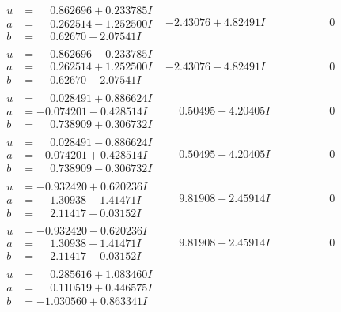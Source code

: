\documentclass[1p]{elsarticle_modified}
\theoremstyle{definition}
\begin{document}
$$\begin{array}{c|c|c}
\begin{aligned}
u &= \phantom{-}0.862696 + 0.233785 I \\
a &= \phantom{-}0.262514 - 1.252500 I \\
b &= \phantom{-}0.62670 - 2.07541 I\end{aligned}
 & -2.43076 + 4.82491 I & \phantom{-0.000000 } 0 \\ \hline\begin{aligned}
u &= \phantom{-}0.862696 - 0.233785 I \\
a &= \phantom{-}0.262514 + 1.252500 I \\
b &= \phantom{-}0.62670 + 2.07541 I\end{aligned}
 & -2.43076 - 4.82491 I & \phantom{-0.000000 } 0 \\ \hline\begin{aligned}
u &= \phantom{-}0.028491 + 0.886624 I \\
a &= -0.074201 - 0.428514 I \\
b &= \phantom{-}0.738909 + 0.306732 I\end{aligned}
 & \phantom{-}0.50495 + 4.20405 I & \phantom{-0.000000 } 0 \\ \hline\begin{aligned}
u &= \phantom{-}0.028491 - 0.886624 I \\
a &= -0.074201 + 0.428514 I \\
b &= \phantom{-}0.738909 - 0.306732 I\end{aligned}
 & \phantom{-}0.50495 - 4.20405 I & \phantom{-0.000000 } 0 \\ \hline\begin{aligned}
u &= -0.932420 + 0.620236 I \\
a &= \phantom{-}1.30938 + 1.41471 I \\
b &= \phantom{-}2.11417 - 0.03152 I\end{aligned}
 & \phantom{-}9.81908 - 2.45914 I & \phantom{-0.000000 } 0 \\ \hline\begin{aligned}
u &= -0.932420 - 0.620236 I \\
a &= \phantom{-}1.30938 - 1.41471 I \\
b &= \phantom{-}2.11417 + 0.03152 I\end{aligned}
 & \phantom{-}9.81908 + 2.45914 I & \phantom{-0.000000 } 0 \\ \hline\begin{aligned}
u &= \phantom{-}0.285616 + 1.083460 I \\
a &= \phantom{-}0.110519 + 0.446575 I \\
b &= -1.030560 + 0.863341 I\end{aligned}

\end{array}$$
\end{document}
